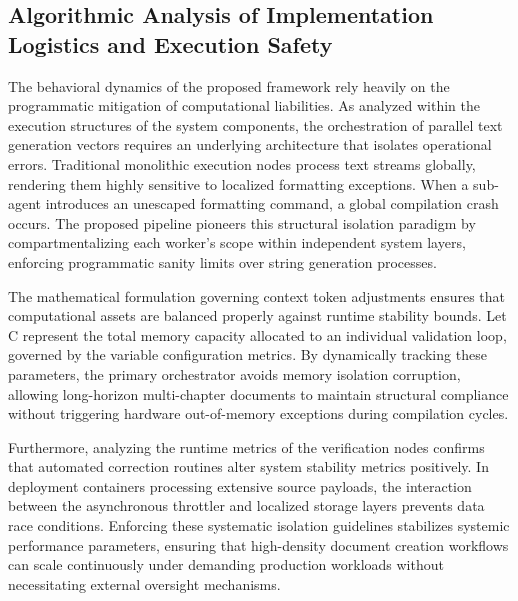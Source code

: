 \subsection{Algorithmic Analysis of Implementation Logistics and Execution Safety}
The behavioral dynamics of the proposed framework rely heavily on the programmatic mitigation of computational liabilities. As analyzed within the execution structures of the system components, the orchestration of parallel text generation vectors requires an underlying architecture that isolates operational errors. Traditional monolithic execution nodes process text streams globally, rendering them highly sensitive to localized formatting exceptions. When a sub-agent introduces an unescaped formatting command, a global compilation crash occurs. The proposed pipeline pioneers this structural isolation paradigm by compartmentalizing each worker's scope within independent system layers, enforcing programmatic sanity limits over string generation processes.

The mathematical formulation governing context token adjustments ensures that computational assets are balanced properly against runtime stability bounds. Let C represent the total memory capacity allocated to an individual validation loop, governed by the variable configuration metrics. By dynamically tracking these parameters, the primary orchestrator avoids memory isolation corruption, allowing long-horizon multi-chapter documents to maintain structural compliance without triggering hardware out-of-memory exceptions during compilation cycles.

Furthermore, analyzing the runtime metrics of the verification nodes confirms that automated correction routines alter system stability metrics positively. In deployment containers processing extensive source payloads, the interaction between the asynchronous throttler and localized storage layers prevents data race conditions. Enforcing these systematic isolation guidelines stabilizes systemic performance parameters, ensuring that high-density document creation workflows can scale continuously under demanding production workloads without necessitating external oversight mechanisms.

